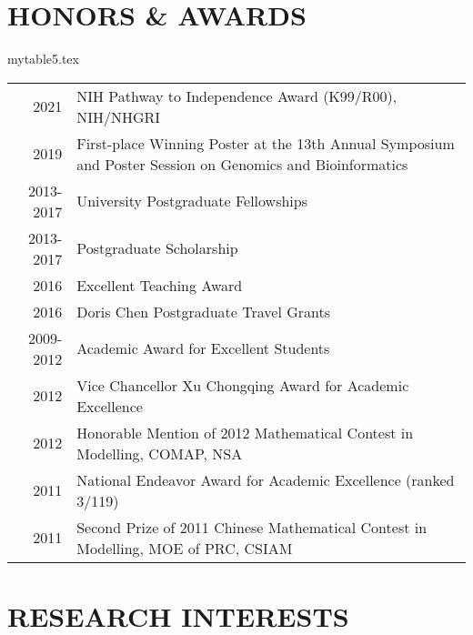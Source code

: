 \documentclass[10pt,letterpaper]{article}
\begin{document}
\section*{HONORS \& AWARDS}
\begin{filecontents}{mytable5.tex}
\begin{longtable}{rX}

2021 &  NIH Pathway to Independence Award (K99/R00), NIH/NHGRI\\

2019 & First-place Winning Poster at the 13th Annual Symposium and Poster Session on Genomics and Bioinformatics\\

2013-2017 & University Postgraduate Fellowships\\

2013-2017 & Postgraduate Scholarship\\  

2016 & Excellent Teaching Award\\

2016 & Doris Chen Postgraduate Travel Grants\\
 
2009-2012 & Academic Award for Excellent Students\\
                
2012 & Vice Chancellor Xu Chongqing Award for Academic Excellence\\  

2012 & Honorable Mention of 2012 Mathematical Contest in Modelling, COMAP, NSA\\                   
  
2011 & National Endeavor Award for Academic Excellence (ranked 3/119)\\                                 
   
2011 & Second Prize of 2011 Chinese Mathematical Contest in Modelling, MOE of PRC, CSIAM\\

\end{longtable}
\end{filecontents}


\section*{RESEARCH INTERESTS}
\end{document}
